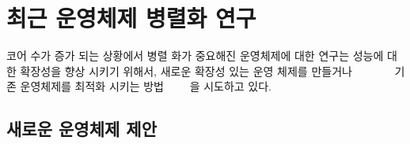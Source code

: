 
\newpage
\section{최근 운영체제 병렬화 연구}
\label{sec:osrelated}

%
 
코어 수가 증가 되는 상황에서 병렬 화가 중요해진 운영체제에 대한 연구는 성능에
 대한 확장성을 향상 시키기 위해서, 새로운 확장성 있는
운영 체제를 만들거나 ~\cite{Boyd-WickizerCorey}~\cite{Wentzlaff2010fOS}
~\cite{Baumann2009Barrelfish}
~\cite{Liu2009Tessellation}~\cite{Farrington2010Helios} 
기존 운영체제를 최적화 시키는
방법~\cite{SilasBoydWickizer2010LinuxScales48}
~\cite{AustinTClements2012RCUBalancedTrees}~\cite{Clements2013RadixVM}~\cite{SilasBoydWickizerPth}을
시도하고 있다.

\subsection{새로운 운영체제 제안}




